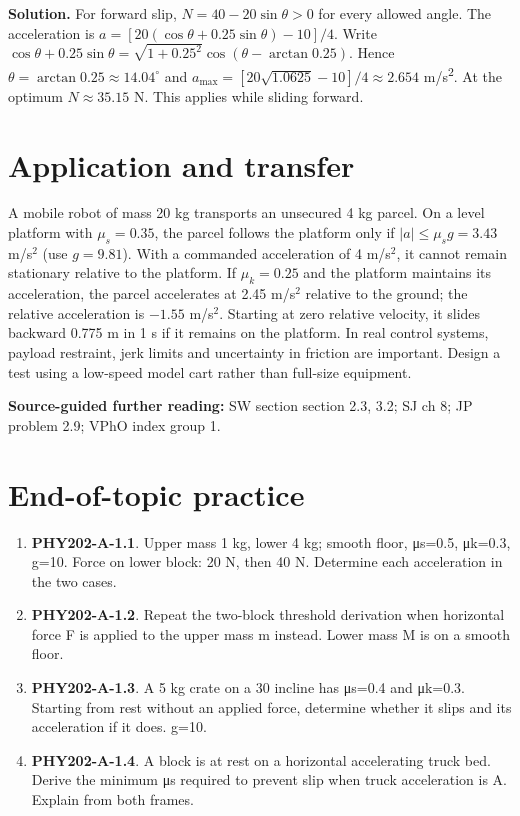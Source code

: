 \documentclass[11pt,a4paper,openany]{book}
\begin{document}
\textbf{Solution.} For forward slip, $N=40-20\sin\theta>0$ for every allowed angle. The acceleration is $a=[20(\cos\theta+0.25\sin\theta)-10]/4$. Write $\cos\theta+0.25\sin\theta=\sqrt{1+0.25^2}\cos(\theta-\arctan0.25)$. Hence $\theta=\arctan0.25\approx14.04^\circ$ and $a_{\max}=[20\sqrt{1.0625}-10]/4\approx2.654$ m/s\textsuperscript{2}. At the optimum $N\approx35.15$ N. This applies while sliding forward.
\section{Application and transfer}
A mobile robot of mass 20 kg transports an unsecured 4 kg parcel. On a level platform with $\mu_s=0.35$, the parcel follows the platform only if $|a|\leq\mu_sg=3.43$ m/s$^2$ (use $g=9.81$). With a commanded acceleration of 4 m/s$^2$, it cannot remain stationary relative to the platform. If $\mu_k=0.25$ and the platform maintains its acceleration, the parcel accelerates at 2.45 m/s$^2$ relative to the ground; the relative acceleration is $-1.55$ m/s$^2$. Starting at zero relative velocity, it slides backward 0.775 m in 1 s if it remains on the platform. In real control systems, payload restraint, jerk limits and uncertainty in friction are important. Design a test using a low-speed model cart rather than full-size equipment.

\textbf{Source-guided further reading:} SW section section 2.3, 3.2; SJ ch 8; JP problem 2.9; VPhO index group 1.

\section{End-of-topic practice}
\begin{enumerate}
\item \textbf{PHY202-A-1.1}. Upper mass 1 kg, lower 4 kg; smooth floor, μs=0.5, μk=0.3, g=10. Force on lower block: 20 N, then 40 N. Determine each acceleration in the two cases.
\item \textbf{PHY202-A-1.2}. Repeat the two-block threshold derivation when horizontal force F is applied to the upper mass m instead. Lower mass M is on a smooth floor.
\item \textbf{PHY202-A-1.3}. A 5 kg crate on a 30\textdegree{} incline has μs=0.4 and μk=0.3. Starting from rest without an applied force, determine whether it slips and its acceleration if it does. g=10.
\item \textbf{PHY202-A-1.4}. A block is at rest on a horizontal accelerating truck bed. Derive the minimum μs required to prevent slip when truck acceleration is A. Explain from both frames.
\end{enumerate}
\end{document}
